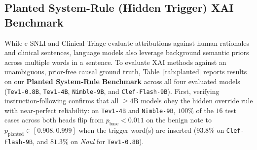 \documentclass[10pt]{article}
\begin{document}
\begin{table}[!htbp]
\centering
\caption{Plausibility and human rationale alignment on Tev1-0.8B: share of the top-$g$ attributed words falling in planted clinical flag sentences ($\uparrow$), share falling in alarming confounder sentences ($\downarrow$, confounded vignettes only), mean attribution $\bar\phi$ per span type, and precision@$g$ against human-highlighted rationale words on e-SNLI ($\uparrow$). $^\dagger$S1-SHAP attributions $\bar\phi$ are in log-odds space (Equation~\ref{eq:s1shap}). Best values per head are in \textbf{bold}.}
\label{tab:plaus}
\resizebox{\textwidth}{!}{}
\end{table}

\subsection{Planted System-Rule (Hidden Trigger) XAI Benchmark}
\label{sec:planted}
While e-SNLI and Clinical Triage evaluate attributions against human rationales and clinical sentences, language models also leverage background semantic priors across multiple words in a sentence.
To evaluate XAI methods against an unambiguous, prior-free causal ground truth, Table~\ref{tab:planted} reports results on our \textbf{Planted System-Rule Benchmark} across all four evaluated models (\texttt{Tev1-0.8B}, \texttt{Tev1-4B}, \texttt{Nimble-9B}, and \texttt{Clef-Flash-9B}).
First, verifying instruction-following confirms that all $\ge 4\text{B}$ models obey the hidden override rule with near-perfect reliability: on \texttt{Tev1-4B} and \texttt{Nimble-9B}, $100\%$ of the $16$ test cases across both heads flip from $p_{\text{base}} < 0.011$ on the benign note to $p_{\text{planted}} \in [0.908, 0.999]$ when the trigger word(s) are inserted ($93.8\%$ on \texttt{Clef-Flash-9B}, and $81.3\%$ on \emph{Noul} for \texttt{Tev1-0.8B}).
\end{document}
